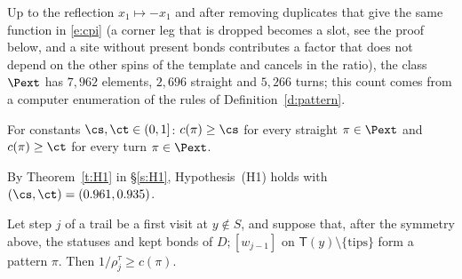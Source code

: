Up to the reflection $x_1 \mapsto -x_1$ and after removing duplicates that give the same function in \eqref{e:cpi} (a corner leg that is dropped becomes a slot, see the proof below, and a site without present bonds contributes a factor that does not depend on the other spins of the template and cancels in the ratio), the class $\Pext$ has $7{, }962$ elements, $2{, }696$ straight and $5{, }266$ turns; this count comes from a computer enumeration of the rules of Definition~\ref{d:pattern}.

\begin{hypothesis}[H1]\label{h:H1}
For constants $\cs, \ct \in (0, 1]$: $c(\pi) \ge \cs$ for every straight $\pi \in \Pext$ and $c(\pi) \ge \ct$ for every turn $\pi \in \Pext$.
\end{hypothesis}

By Theorem~\ref{t:H1} in \S\ref{s:H1}, Hypothesis~(H1) holds with $(\cs, \ct) = (0.961, 0.935)$.

\begin{lemma}\label{l:local}
Let step $j$ of a trail be a first visit at $y \notin S$, and suppose that, after the symmetry above, the statuses and kept bonds of $D;[w_{j - 1}]$ on $\mathsf T(y) \setminus \{\text{tips}\}$ form a pattern $\pi$. Then $1/\rho^\tau_j \ge c(\pi)$.
\end{lemma}

